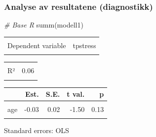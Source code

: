 \documentclass[
]{article}
\newenvironment{Shaded}{\begin{snugshade}}{\end{snugshade}}
\newcommand{\CommentTok}[1]{\textcolor[rgb]{0.56,0.35,0.01}{\textit{#1}}}
\newcommand{\FunctionTok}[1]{\textcolor[rgb]{0.00,0.00,0.00}{#1}}
\newcommand{\NormalTok}[1]{#1}
\begin{document}
\hypertarget{analyse-av-resultatene-diagnostikk-1}{%
\subsubsection{Analyse av resultatene (diagnostikk)}\label{analyse-av-resultatene-diagnostikk-1}}

\begin{Shaded}
\begin{Highlighting}[]
\CommentTok{\# Base R}
\FunctionTok{summ}\NormalTok{(modell1)}
\end{Highlighting}
\end{Shaded}

\begin{table}[!h]
\centering
\begin{tabular}{lr}
\toprule
\cellcolor{gray!6}{Observations} & \cellcolor{gray!6}{423}\\
Dependent variable & tpstress\\
\cellcolor{gray!6}{Type} & \cellcolor{gray!6}{OLS linear regression}\\
\bottomrule
\end{tabular}
\end{table} \begin{table}[!h]
\centering
\begin{tabular}{lr}
\toprule
\cellcolor{gray!6}{F(2,420)} & \cellcolor{gray!6}{13.16}\\
R² & 0.06\\
\cellcolor{gray!6}{Adj. R²} & \cellcolor{gray!6}{0.05}\\
\bottomrule
\end{tabular}
\end{table} \begin{table}[!h]
\centering
\begin{threeparttable}
\begin{tabular}{lrrrr}
\toprule
  & Est. & S.E. & t val. & p\\
\midrule
\cellcolor{gray!6}{(Intercept)} & \cellcolor{gray!6}{31.24} & \cellcolor{gray!6}{1.00} & \cellcolor{gray!6}{31.34} & \cellcolor{gray!6}{0.00}\\
age & -0.03 & 0.02 & -1.50 & 0.13\\
\cellcolor{gray!6}{tmarlow} & \cellcolor{gray!6}{-0.62} & \cellcolor{gray!6}{0.14} & \cellcolor{gray!6}{-4.35} & \cellcolor{gray!6}{0.00}\\
\bottomrule
\end{tabular}
\begin{tablenotes}
\item Standard errors: OLS
\end{tablenotes}
\end{threeparttable}
\end{table}
\end{document}
